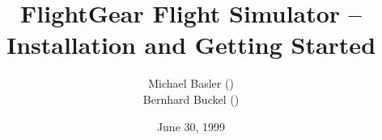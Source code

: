 
\title{FlightGear Flight Simulator -- Installation and Getting Started}

\author{
 Michael Basler ()\\
 Bernhard Buckel
 ()\\
{ \setlength{\fboxsep}{12mm}\setlength{\fboxrule}{0pt}
 }}

\date{June 30, 1999}

\maketitle


\tableofcontents


